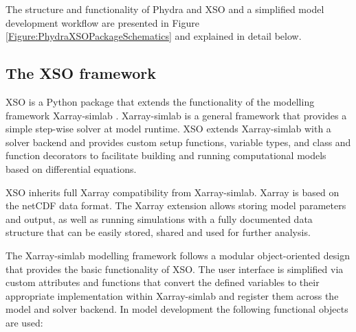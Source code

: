 \documentclass[journal abbreviation, manuscript]{copernicus}
\begin{document}
The structure and functionality of Phydra and XSO and a simplified model development workflow are presented in Figure \ref{Figure:PhydraXSOPackageSchematics} and explained in detail below.

\subsection{The XSO framework} \label{Section:XSOFramework}

XSO is a Python package that extends the functionality of the modelling framework Xarray-simlab \citep{Bovy2018Xarray-simlab:Interactively}. Xarray-simlab is a general framework that provides a simple step-wise solver at model runtime. XSO extends Xarray-simlab with a solver backend and provides custom setup functions, variable types, and class and function decorators to facilitate building and running computational models based on differential equations.

XSO inherits full Xarray compatibility from Xarray-simlab. Xarray is based on the netCDF data format. The Xarray extension allows storing model parameters and output, as well as running simulations with a fully documented data structure that can be easily stored, shared and used for further analysis.

The Xarray-simlab modelling framework follows a modular object-oriented design that provides the basic functionality of XSO. The user interface is simplified via custom attributes and functions that convert the defined variables to their appropriate implementation within Xarray-simlab and register them across the model and solver backend. In model development the following functional objects are used:
\end{document}
